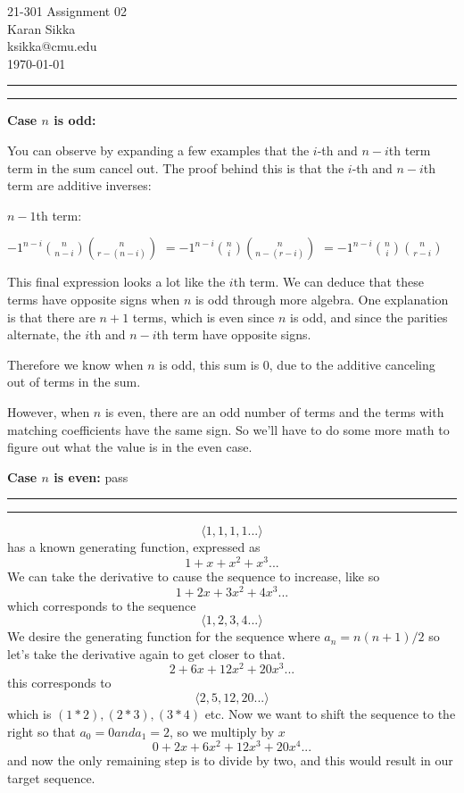 \documentclass[11pt,letterpaper]{article}
\makeatletter
\newcommand{\question}[2] {\vspace{.25in} \hrule\vspace{0.5em}
\noindent{\bf #1: #2} \vspace{0.5em}
\hrule \vspace{.10in}}
\newcommand{\myname}{Karan Sikka}
\newcommand{\myandrew}{ksikka@cmu.edu}
\newcommand{\myhwnum}{02}
\makeatother
\begin{document}
\medskip

\thispagestyle{plain}
\begin{center}                  %
{\Large 21-301 Assignment \myhwnum} \\
\myname \\
\myandrew \\
\today
\end{center}


\question{1}{1}
\textbf{Case $n$ is odd:}

You can observe by expanding a few examples that the $i$-th and $n-i$th term term in the sum cancel out.
The proof behind this is that the $i$-th and $n-i$th term are additive inverses:

$n-1$th term:

$ -1^{n-i} { n \choose n - i } { n \choose r - (n-i) }$
$=  -1^{n-i} { n \choose i } { n \choose n - (r-i) }$
$=  -1^{n-i} { n \choose i } { n \choose r - i }$

This final expression looks a lot like the $i$th term. We can deduce that these terms have opposite signs when $n$ is odd through more algebra.
One explanation is that there are $n + 1$ terms, which is even since $n$ is odd, and since the parities alternate, the $i$th and $n-i$th term have opposite signs.

Therefore we know when $n$ is odd, this sum is 0, due to the additive canceling out of terms in the sum.


However, when $n$ is even, there are an odd number of terms and the terms with matching coefficients have the same sign. So we'll have to do some more math to figure out what the value is in the even case.

\textbf{Case $n$ is even:}
pass



\question{2}{2}
$$\langle 1, 1, 1, 1 ... \rangle$$
has a known generating function, expressed as
$$ 1 + x + x^2 + x^3 ... $$
We can take the derivative to cause the sequence to increase, like so
$$ 1 + 2x + 3x^2 + 4x^3 ... $$
which corresponds to the sequence
$$\langle 1, 2, 3, 4 ... \rangle$$
We desire the generating function for the sequence where $a_n = n(n+1)/2$ so let's take the derivative again to get closer to that.
$$ 2 + 6x + 12x^2 + 20x^3 ... $$
this corresponds to
$$\langle 2, 5, 12, 20 ... \rangle$$
which is $(1*2), (2*3), (3*4)$ etc. Now we want to shift the sequence to the right so that $a_0 = 0 and a_1 = 2$, so we multiply by $x$
$$ 0 + 2x + 6x^2 + 12x^3 + 20x^4 ... $$
and now the only remaining step is to divide by two, and this would result in our target sequence.
\end{document}
